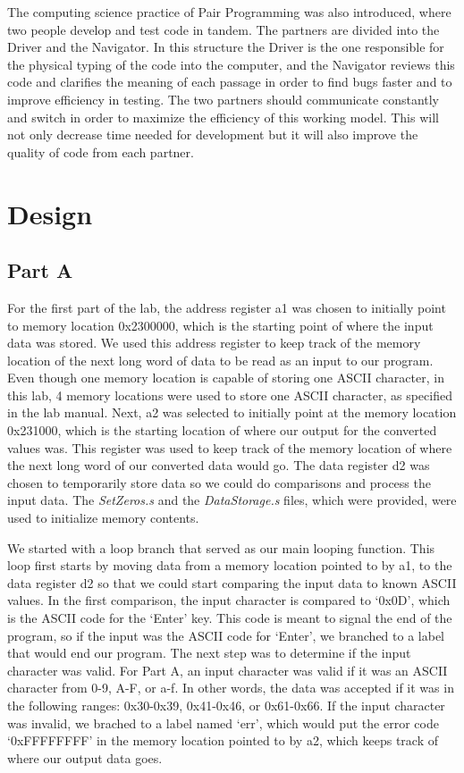\documentclass[letterpaper]{article}
\begin{document}
  The computing science practice of Pair Programming was also introduced, where two people
  develop and test code in tandem.  The partners are divided into the Driver and the Navigator.
  In this structure the Driver is the one responsible for the physical typing of the code into the computer,
  and the Navigator reviews this code and clarifies the meaning of each passage in order to find bugs faster
  and to improve efficiency in testing.  The two partners should communicate constantly and switch in order
  to maximize the efficiency of this working model.  This will not only decrease time needed for development
  but it will also improve the quality of code from each partner.


\section{Design}
  \subsection{Part A}
    For the first part of the lab, the address register a1 was chosen to initially point to
    memory location 0x2300000, which is the starting point of where the input data was stored.
    We used this address register to keep track of the memory location of the next long word
    of data to be read as an input to our program. Even though one memory location is capable
    of storing one ASCII character, in this lab, 4 memory locations were used to store one
    ASCII character, as specified in the lab manual.
    Next, a2 was selected to initially point at the memory location 0x231000, which is the
    starting location of where our output for the converted values was. This register
    was used to keep track of the memory location of where the next long word of
    our converted data would go. The data register d2 was chosen to temporarily store
    data so we could do comparisons and process the input data.
    The \textit{SetZeros.s} and the \textit{DataStorage.s}
    files, which were provided, were used to initialize memory contents.

    We started with a loop branch that served as our main looping function. This
    loop first starts by moving data from a memory location pointed to by a1, to
    the data register d2 so that we could start comparing the input data to known ASCII values.
    In the first comparison, the input character is compared to `0x0D', which is the ASCII
    code for the `Enter' key. This code is meant to signal the end of the program, so if
    the input was the ASCII code for `Enter', we branched to a label that
    would end our program. The next step was to determine if the input character was valid.
    For Part A, an input character was valid if it was an ASCII character from 0-9, A-F, or a-f.
    In other words, the data was accepted if it was in the following ranges: 0x30-0x39,
    0x41-0x46, or 0x61-0x66. If the input character was invalid, we brached to a label
    named `err', which would put the error code `0xFFFFFFFF' in the memory location
    pointed to by a2, which keeps track of where our output data goes.
\end{document}
